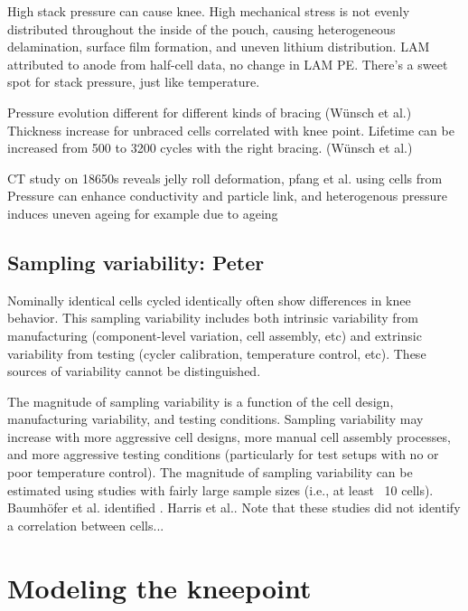 \documentclass{article}
\begin{document}
High stack pressure can cause knee. High mechanical stress is not evenly distributed throughout the inside of the pouch, causing heterogeneous delamination, surface film formation, and uneven lithium distribution. LAM attributed to anode from half-cell data, no change in LAM PE. There's a sweet spot for stack pressure, just like temperature.\cite{cannarella_stress_2014}

Pressure evolution different for different kinds of bracing (Wünsch et al.) Thickness increase for unbraced cells correlated with knee point. Lifetime can be increased from 500 to 3200 cycles with the right bracing. (Wünsch et al.)

CT study on 18650s reveals jelly roll deformation, pfang et al. \cite{pfrang_long-term_2018} using cells from 
Pressure can enhance conductivity and particle link, and 
heterogenous pressure induces uneven ageing for example due to ageing \cite{bach_nonlinear_2016}



\subsection{Sampling variability: Peter}

Nominally identical cells cycled identically often show differences in knee behavior. This sampling variability includes both intrinsic variability from manufacturing (component-level variation, cell assembly, etc) and extrinsic variability from testing (cycler calibration, temperature control, etc). These sources of variability cannot be distinguished.

The magnitude of sampling variability is a function of the cell design, manufacturing variability, and testing conditions. Sampling variability may increase with more aggressive cell designs, more manual cell assembly processes, and more aggressive testing conditions (particularly for test setups with no or poor temperature control). The magnitude of sampling variability can be estimated using studies with fairly large sample sizes (i.e., at least ~10 cells). Baumhöfer et al.\cite{baumhofer_production_2014} identified . Harris et al.\cite{harris_failure_2017}. Note that these studies did not identify a correlation between cells...

\section{Modeling the kneepoint}
\end{document}
